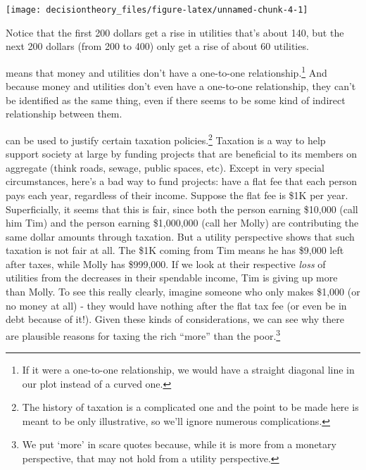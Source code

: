 \documentclass[]{tufte-book}
\begin{document}
\begin{marginfigure}
\texttt{[image: decisiontheory\_files/figure-latex/unnamed-chunk-4-1]} \caption[Notice that the first 200 dollars get a rise in utilities that's about 140, but the next 200 dollars (from 200 to 400) only get a rise of about 60 utilities]{Notice that the first 200 dollars get a rise in utilities that's about 140, but the next 200 dollars (from 200 to 400) only get a rise of about 60 utilities.}\label{fig:unnamed-chunk-4}
\end{marginfigure}

 means that money and utilities don't have a one-to-one relationship.\footnote{If it were a one-to-one relationship, we would have a straight diagonal line in our plot instead of a curved one.} And because money and utilities don't even have a one-to-one relationship, they can't be identified as the same thing, even if there seems to be some kind of indirect relationship between them.

 can be used to justify certain taxation policies.\footnote{The history of taxation is a complicated one and the point to be made here is meant to be only illustrative, so we'll ignore numerous complications.} Taxation is a way to help support society at large by funding projects that are beneficial to its members on aggregate (think roads, sewage, public spaces, etc). Except in very special circumstances, here's a bad way to fund projects: have a flat fee that each person pays each year, regardless of their income. Suppose the flat fee is \$1K per year. Superficially, it seems that this is fair, since both the person earning \$10,000 (call him Tim) and the person earning \$1,000,000 (call her Molly) are contributing the same dollar amounts through taxation. But a utility perspective shows that such taxation is not fair at all. The \$1K coming from Tim means he has \$9,000 left after taxes, while Molly has \$999,000. If we look at their respective \emph{loss} of utilities from the decreases in their spendable income, Tim is giving up more than Molly. To see this really clearly, imagine someone who only makes \$1,000 (or no money at all) - they would have nothing after the flat tax fee (or even be in debt because of it!). Given these kinds of considerations, we can see why there are plausible reasons for taxing the rich ``more'' than the poor.\footnote{We put `more' in scare quotes because, while it is more from a monetary perspective, that may not hold from a utility perspective.}
\end{document}
